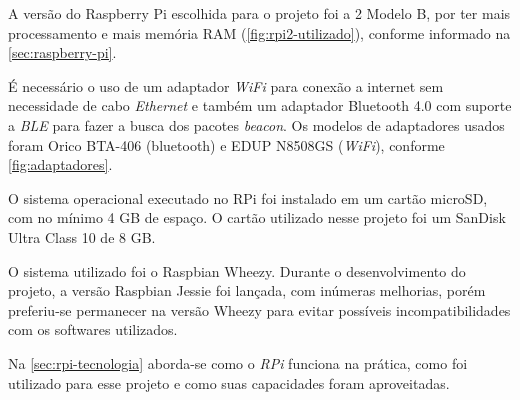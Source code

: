 A versão do Raspberry Pi escolhida para o projeto foi a 2 Modelo B, por ter mais processamento e mais memória RAM (\autoref{fig:rpi2-utilizado}), conforme informado na \autoref{sec:raspberry-pi}.

É necessário o uso de um adaptador \textit{WiFi} para conexão a internet sem necessidade de cabo \textit{Ethernet} e também um adaptador Bluetooth 4.0 com suporte a \textit{BLE} para fazer a busca dos pacotes \textit{beacon}. Os modelos de adaptadores usados foram Orico BTA-406 (bluetooth) e EDUP N8508GS (\textit{WiFi}), conforme \autoref{fig:adaptadores}.

O sistema operacional executado no RPi foi instalado em um cartão microSD, com no mínimo 4 GB de espaço. O cartão utilizado nesse projeto foi um SanDisk Ultra Class 10 de 8 GB. 

O sistema utilizado foi o Raspbian Wheezy. Durante o desenvolvimento do projeto, a versão Raspbian Jessie foi lançada, com inúmeras melhorias, porém preferiu-se permanecer na versão Wheezy para evitar possíveis incompatibilidades com os softwares utilizados.

Na \autoref{sec:rpi-tecnologia} aborda-se como o \textit{RPi} funciona na prática, como foi utilizado para esse projeto e como suas capacidades foram aproveitadas.

